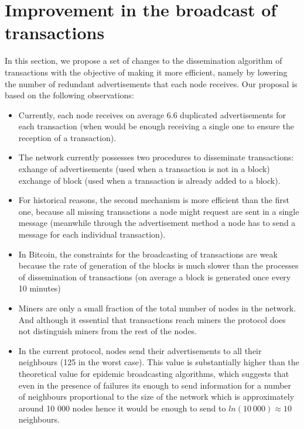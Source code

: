 \documentclass{dads}   %
\begin{document}
\section{Improvement in the broadcast of transactions}
In this section, we propose a set of changes to the dissemination algorithm of transactions with the objective of making it more efficient, namely by lowering the number of redundant advertisements that each node receives. Our proposal is based on the following observations:

\begin{itemize}
  \item Currently, each node receives on average $6.6$ duplicated advertisements for each transaction (when would be enough receiving a single one to ensure the reception of a transaction).
  \item The network currently possesses two procedures to disseminate transactions: exhange of advertisements (used when a transaction is not in a block) exchange of block (used when a transaction is already added to a block).
  \item For historical reasons, the second mechanism is more efficient than the first one, because all missing transactions a node might request are sent in a single message (meanwhile through the advertisement method a node has to send a message for each individual transaction).
  \item In Bitcoin, the constraints for the broadcasting of transactions are weak because the rate of generation of the blocks is much slower than the processes of dissemination of transactions (on average a block is generated once every 10 minutes)
  \item Miners are only a small fraction of the total number of nodes in the network. And although it essential that transactions reach miners the protocol does not distinguish miners from the rest of the nodes.
  \item In the current protocol, nodes send their advertisements to all their neighbours (125 in the worst case). This value is substantially higher than the theoretical value for epidemic broadcasting algorithms, which suggests that even in the presence of failures its enough to send information for a number of neighbours proportional to the size of the network which is approximately around 10 000 nodes hence it would be enough to send to $ ln(10~000) \approx 10$ neighbours.
\end{itemize}
\end{document}
